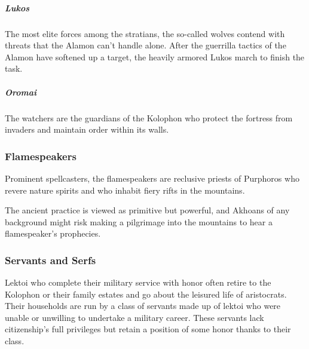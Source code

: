         \subparagraph{Lukos} The most elite forces among the stratians, the so-called wolves contend with threats that the Alamon can't handle alone.
        After the guerrilla tactics of the Alamon have softened up a target, the heavily armored Lukos march to finish the task.

        \subparagraph{Oromai} The watchers are the guardians of the Kolophon who protect the fortress from invaders and maintain order within its walls.

    \subsubsection{Flamespeakers}
        Prominent spellcasters, the flamespeakers are reclusive priests of Purphoros who revere nature spirits and who inhabit fiery rifts in the mountains.

        \pagebreak


        \vspace{12.5cm}

        The ancient practice is viewed as primitive but powerful, and Akhoans of any background might risk making a pilgrimage into the mountains to hear a flamespeaker's prophecies.

    \subsubsection{Servants and Serfs}
        Lektoi who complete their military service with honor often retire to the Kolophon or their family estates and go about the leisured life of aristocrats.
        Their households are run by a class of servants made up of lektoi who were unable or unwilling to undertake a military career.
        These servants lack citizenship's full privileges but retain a position of some honor thanks to their class.


